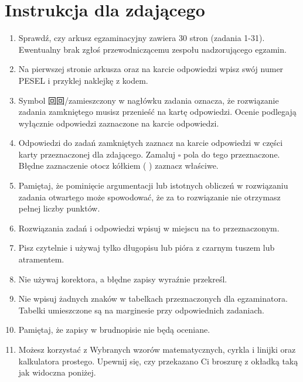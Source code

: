 \documentclass[10pt]{article}
\begin{document}
\section*{Instrukcja dla zdającego}
\begin{enumerate}
  \item Sprawdź, czy arkusz egzaminacyjny zawiera 30 stron (zadania 1-31). Ewentualny brak zgłoś przewodniczącemu zespołu nadzorującego egzamin.
  \item Na pierwszej stronie arkusza oraz na karcie odpowiedzi wpisz swój numer PESEL i przyklej naklejkę z kodem.
  \item Symbol 回回/zamieszczony w nagłówku zadania oznacza, że rozwiązanie zadania zamkniętego musisz przenieść na kartę odpowiedzi. Ocenie podlegają wyłącznie odpowiedzi zaznaczone na karcie odpowiedzi.
  \item Odpowiedzi do zadań zamkniętych zaznacz na karcie odpowiedzi w części karty przeznaczonej dla zdającego. Zamaluj \(\square\) pola do tego przeznaczone. Błędne zaznaczenie otocz kółkiem ( ) zaznacz właściwe.
  \item Pamiętaj, że pominięcie argumentacji lub istotnych obliczeń w rozwiązaniu zadania otwartego może spowodować, że za to rozwiązanie nie otrzymasz pełnej liczby punktów.
  \item Rozwiązania zadań i odpowiedzi wpisuj w miejscu na to przeznaczonym.
  \item Pisz czytelnie i używaj tylko długopisu lub pióra z czarnym tuszem lub atramentem.
  \item Nie używaj korektora, a błędne zapisy wyraźnie przekreśl.
  \item Nie wpisuj żadnych znaków w tabelkach przeznaczonych dla egzaminatora. Tabelki umieszczone są na marginesie przy odpowiednich zadaniach.
  \item Pamiętaj, że zapisy w brudnopisie nie będą oceniane.
  \item Możesz korzystać z Wybranych wzorów matematycznych, cyrkla i linijki oraz kalkulatora prostego. Upewnij się, czy przekazano Ci broszurę z okładką taką jak widoczna poniżej.\\

\end{enumerate}
\end{document}
